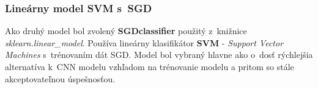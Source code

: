\documentclass[11pt, a4paper]{article}
\begin{document}
\subsubsection{Lineárny model SVM s~SGD}
Ako druhý model bol zvolený \textbf{SGDclassifier} použitý z~knižnice \emph{sklearn.linear\_model}. Používa lineárny klasifikátor \textbf{SVM} - \emph{Support Vector Machines} s~trénovaním dát SGD. Model bol vybraný hlavne ako o~dosť rýchlejšia alternatíva k~CNN modelu vzhľadom na trénovanie modelu a pritom so stále akceptovateľnou úspešnosťou.
		
\end{document}
